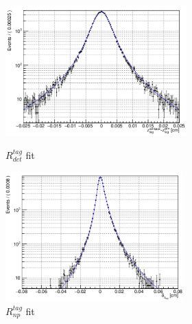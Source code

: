 \begin{figure}[H]
	\begin{minipage}[b]{0.5\linewidth}
		\centering
		\includegraphics[height=5cm]{figures/Rdet}
		\caption{$R_{det}^{tag} $ fit}
		\label{fig:Rtagdet}
	\end{minipage}
	\begin{minipage}[b]{0.5\linewidth}
		\centering
		\includegraphics[height=5cm]{figures/Rnp}
		\caption{$R_{np}^{tag}$ fit}
		\label{fig:Rtagnp}
	\end{minipage}
\end{figure}

